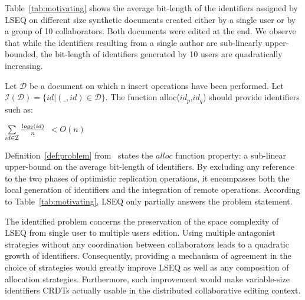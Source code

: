 Table~\ref{tab:motivating} shows the average bit-length of the identifiers
assigned by LSEQ on different size synthetic documents created either by a
single user or by a group of 10 collaborators. Both documents were edited at
the end. We observe that while the identifiers resulting from a single author
are sub-linearly upper-bounded, the bit-length of identifiers generated by 10
users are quadratically increasing.

\begin{Def}
  Let $\mathcal{D}$ be a document on which n insert operations have been
  performed. Let $\mathcal{I}(\mathcal{D}) = \{id|(\_, id) \in
  \mathcal{D}\}$. The function alloc($id_p$,$id_q$) should provide identifiers
  such as:
  \begin{center}
    $\sum\limits_{id \in \mathcal{I}} {{ log_2(id)}\over{n}} $ $< O(n)$
  \end{center}
\label{def:problem}
\end{Def}

Definition~\ref{def:problem} from~\cite{nedelec2013lseq} states the $alloc$
function property: a sub-linear upper-bound on the average bit-length of
identifiers. By excluding any reference to the two phases of optimistic
replication operations, it encompasses both the local generation of identifiers
and the integration of remote operations.  According to
Table~\ref{tab:motivating}, LSEQ only partially answers the problem statement.


The identified problem concerns the preservation of the space complexity of
LSEQ from single user to multiple users edition. Using multiple antagonist
strategies without any coordination between collaborators leads to a quadratic
growth of identifiers. Consequently, providing a mechanism of agreement in the
choice of strategies would greatly improve LSEQ as well as any composition of
allocation strategies. Furthermore, such improvement would make variable-size
identifiers CRDTs actually usable in the distributed collaborative editing
context.

